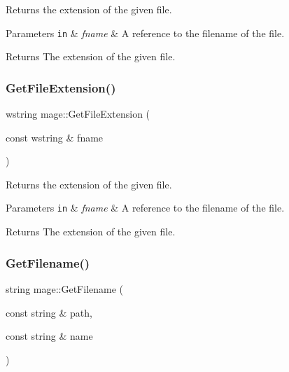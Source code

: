 Returns the extension of the given file.


\begin{DoxyParams}[1]{Parameters}
\mbox{\tt in}  & {\em fname} & A reference to the filename of the file. \\
\hline
\end{DoxyParams}
\begin{DoxyReturn}{Returns}
The extension of the given file. 
\end{DoxyReturn}
\hypertarget{namespacemage_ac95841e5c563311d50ef3524d5b7a8d8}{}\label{namespacemage_ac95841e5c563311d50ef3524d5b7a8d8} 
\subsubsection{\texorpdfstring{Get\+File\+Extension()}{GetFileExtension()}\hspace{0.1cm}{\footnotesize\ttfamily [2/2]}}
{\footnotesize\ttfamily wstring mage\+::\+Get\+File\+Extension (\begin{DoxyParamCaption}\item[{const wstring \&}]{fname }\end{DoxyParamCaption})}

Returns the extension of the given file.


\begin{DoxyParams}[1]{Parameters}
\mbox{\tt in}  & {\em fname} & A reference to the filename of the file. \\
\hline
\end{DoxyParams}
\begin{DoxyReturn}{Returns}
The extension of the given file. 
\end{DoxyReturn}
\hypertarget{namespacemage_a74d063f352449eb92ca6d5faabb2f3cf}{}\label{namespacemage_a74d063f352449eb92ca6d5faabb2f3cf} 
\subsubsection{\texorpdfstring{Get\+Filename()}{GetFilename()}\hspace{0.1cm}{\footnotesize\ttfamily [1/2]}}
{\footnotesize\ttfamily string mage\+::\+Get\+Filename (\begin{DoxyParamCaption}\item[{const string \&}]{path,  }\item[{const string \&}]{name }\end{DoxyParamCaption})}

